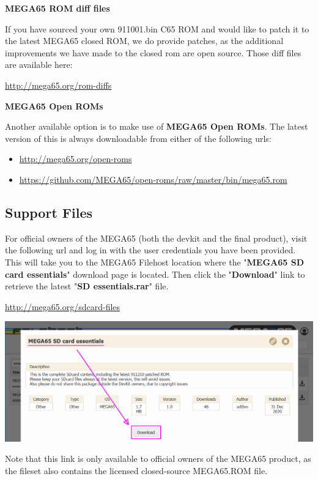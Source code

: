 \textbf{MEGA65 ROM diff files}

If you have sourced your own 911001.bin C65 ROM and would like to patch it to the latest MEGA65 closed ROM,
we do provide patches, as the additional improvements we have made to the closed rom are open source.
Those diff files are available here:

\url{http://mega65.org/rom-diffs}

\textbf{MEGA65 Open ROMs}

Another available option is to make use of \textbf{MEGA65 Open ROMs}. The latest version of this is always downloadable from either of the following urls:

\begin{itemize}
  \item \url{http://mega65.org/open-roms}
  \item \url{https://github.com/MEGA65/open-roms/raw/master/bin/mega65.rom}
\end{itemize}


\subsection{Support Files}

For official owners of the MEGA65 (both the devkit and the final product), visit the following url and log in with the user credentials you have been provided. This will take you to the MEGA65 Filehost location where the "\textbf{MEGA65 SD card essentials}" download page is located. Then click the "\textbf{Download}" link to retrieve the latest "\textbf{SD essentials.rar}" file.

\url{http://mega65.org/sdcard-files}

\includegraphics[width=\linewidth]{images/latest_support_files_with_closedrom.png}

Note that this link is only available to official owners of the MEGA65 product, as the fileset also contains the licensed closed-source MEGA65.ROM file.

